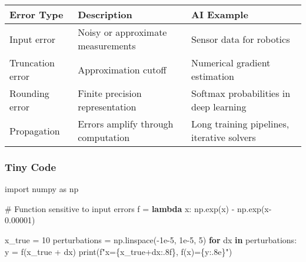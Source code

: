\documentclass[
  letterpaper,
  DIV=11,
  numbers=noendperiod]{scrreprt}
\newenvironment{Shaded}{\begin{snugshade}}{\end{snugshade}}
\newcommand{\BuiltInTok}[1]{\textcolor[rgb]{0.00,0.23,0.31}{#1}}
\newcommand{\CommentTok}[1]{\textcolor[rgb]{0.37,0.37,0.37}{#1}}
\newcommand{\ControlFlowTok}[1]{\textcolor[rgb]{0.00,0.23,0.31}{\textbf{#1}}}
\newcommand{\DecValTok}[1]{\textcolor[rgb]{0.68,0.00,0.00}{#1}}
\newcommand{\FloatTok}[1]{\textcolor[rgb]{0.68,0.00,0.00}{#1}}
\newcommand{\ImportTok}[1]{\textcolor[rgb]{0.00,0.46,0.62}{#1}}
\newcommand{\KeywordTok}[1]{\textcolor[rgb]{0.00,0.23,0.31}{\textbf{#1}}}
\newcommand{\NormalTok}[1]{\textcolor[rgb]{0.00,0.23,0.31}{#1}}
\newcommand{\OperatorTok}[1]{\textcolor[rgb]{0.37,0.37,0.37}{#1}}
\newcommand{\SpecialCharTok}[1]{\textcolor[rgb]{0.37,0.37,0.37}{#1}}
\newcommand{\SpecialStringTok}[1]{\textcolor[rgb]{0.13,0.47,0.30}{#1}}
\begin{document}
\begin{longtable}[]{@{}
  >{\raggedright\arraybackslash}p{}
  >{\raggedright\arraybackslash}p{}
  >{\raggedright\arraybackslash}p{}@{}}
\toprule\noalign{}
\begin{minipage}[b]{\linewidth}\raggedright
Error Type
\end{minipage} & \begin{minipage}[b]{\linewidth}\raggedright
Description
\end{minipage} & \begin{minipage}[b]{\linewidth}\raggedright
AI Example
\end{minipage} \\
\midrule\noalign{}
\endhead
\bottomrule\noalign{}
\endlastfoot
Input error & Noisy or approximate measurements & Sensor data for
robotics \\
Truncation error & Approximation cutoff & Numerical gradient
estimation \\
Rounding error & Finite precision representation & Softmax probabilities
in deep learning \\
Propagation & Errors amplify through computation & Long training
pipelines, iterative solvers \\
\end{longtable}

\subsubsection{Tiny Code}\label{tiny-code-158}

\begin{Shaded}
\begin{Highlighting}[]
\ImportTok{import}\NormalTok{ numpy }\ImportTok{as}\NormalTok{ np}

\CommentTok{\# Function sensitive to input errors}
\NormalTok{f }\OperatorTok{=} \KeywordTok{lambda}\NormalTok{ x: np.exp(x) }\OperatorTok{{-}}\NormalTok{ np.exp(x}\OperatorTok{{-}}\FloatTok{0.00001}\NormalTok{)}

\NormalTok{x\_true }\OperatorTok{=} \DecValTok{10}
\NormalTok{perturbations }\OperatorTok{=}\NormalTok{ np.linspace(}\OperatorTok{{-}}\FloatTok{1e{-}5}\NormalTok{, }\FloatTok{1e{-}5}\NormalTok{, }\DecValTok{5}\NormalTok{)}
\ControlFlowTok{for}\NormalTok{ dx }\KeywordTok{in}\NormalTok{ perturbations:}
\NormalTok{    y }\OperatorTok{=}\NormalTok{ f(x\_true }\OperatorTok{+}\NormalTok{ dx)}
    \BuiltInTok{print}\NormalTok{(}\SpecialStringTok{f"x=}\SpecialCharTok{\{}\NormalTok{x\_true}\OperatorTok{+}\NormalTok{dx}\SpecialCharTok{:.8f\}}\SpecialStringTok{, f(x)=}\SpecialCharTok{\{}\NormalTok{y}\SpecialCharTok{:.8e\}}\SpecialStringTok{"}\NormalTok{)}
\end{Highlighting}
\end{Shaded}
\end{document}
